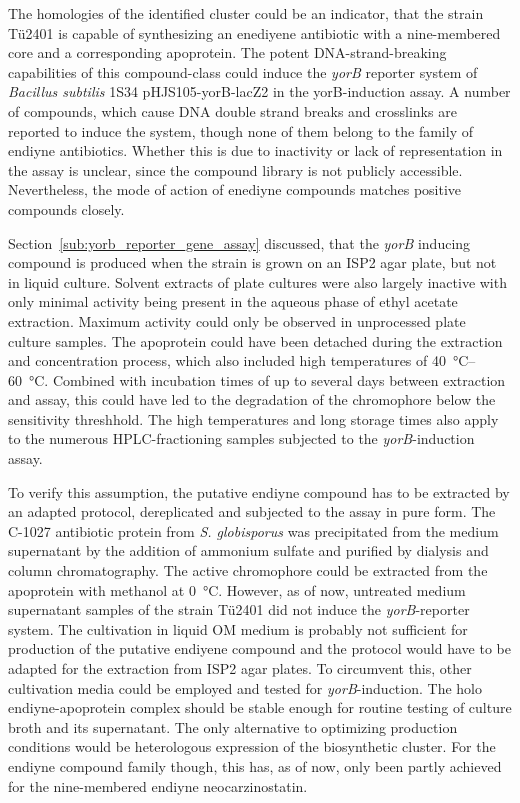 The homologies of the identified cluster could be an indicator, that the strain Tü2401 is capable of synthesizing an enediyene antibiotic with a nine-membered core and a corresponding apoprotein.
The potent DNA-strand-breaking capabilities of this compound-class could induce the \textit{yorB} reporter system of \textit{Bacillus subtilis} 1S34 pHJS105-yorB-lacZ2 in the yorB-induction assay.
A number of compounds, which cause DNA double strand breaks and crosslinks are reported to induce the system, though none of them belong to the family of endiyne antibiotics.\autocite{Urban2007}
Whether this is due to inactivity or lack of representation in the assay is unclear, since the compound library is not publicly accessible.
Nevertheless, the mode of action of enediyne compounds matches positive compounds closely.

Section~\ref{sub:yorb_reporter_gene_assay} discussed, that the \textit{yorB} inducing compound is produced when the strain is grown on an ISP2 agar plate, but not in liquid culture.
Solvent extracts of plate cultures were also largely inactive with only minimal activity being present in the aqueous phase of ethyl acetate extraction.
Maximum activity could only be observed in unprocessed plate culture samples.
The apoprotein could have been detached during the extraction and concentration process, which also included high temperatures of \SIrange[range-units=single]{40}{60}{\celsius}.
Combined with incubation times of up to several days between extraction and assay, this could have led to the degradation of the chromophore below the sensitivity threshhold.
The high temperatures and long storage times also apply to the numerous HPLC-fractioning samples subjected to the \textit{yorB}-induction assay.

To verify this assumption, the putative endiyne compound has to be extracted by an adapted protocol, dereplicated and subjected to the assay in pure form.
The C-1027 antibiotic protein from \textit{S. globisporus} was precipitated from the medium supernatant by the addition of ammonium sulfate and purified by dialysis and column chromatography.\autocite{Otani1988a}
The active chromophore could be extracted from the apoprotein with methanol at \SI{0}{\celsius}.\autocite{Matsumoto1993}
However, as of now, untreated medium supernatant samples of the strain Tü2401 did not induce the \textit{yorB}-reporter system.
The cultivation in liquid OM medium is probably not sufficient for production of the putative endiyene compound and the protocol would have to be adapted for the extraction from ISP2 agar plates.
To circumvent this, other cultivation media could be employed and tested for \textit{yorB}-induction.
The holo endiyne-apoprotein complex should be stable enough for routine testing of culture broth and its supernatant.
The only alternative to optimizing production conditions would be heterologous expression of the biosynthetic cluster.
For the endiyne compound family though, this has, as of now, only been partly achieved for the nine-membered endiyne neocarzinostatin.\autocite{Zhang2008}

